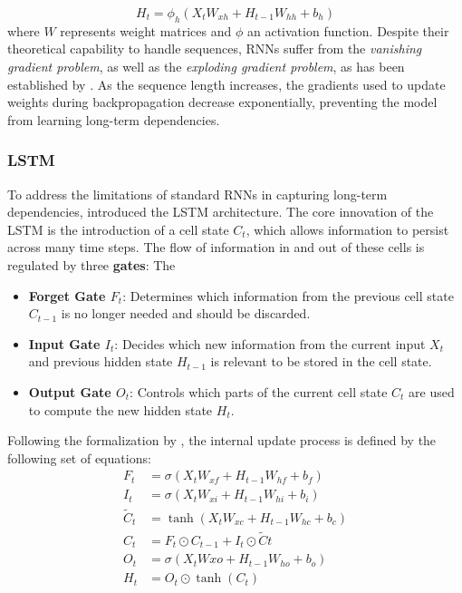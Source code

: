     \begin{equation}
        H_t = \phi_h (X_t W_{xh} + H_{t-1} W_{hh} + b_h) %
    \end{equation}
    where $W$ represents weight matrices and $\phi$ an activation function. Despite their theoretical capability to handle sequences, \acp{RNN} suffer from the \textit{vanishing gradient problem}, as well as the \textit{exploding gradient problem}, as has been established by \cite{279181bengio}. As the sequence length increases, the gradients used to update weights during backpropagation decrease exponentially, preventing the model from learning long-term dependencies.
    
    \subsubsection{LSTM}
     To address the limitations of standard \acp{RNN} in capturing long-term dependencies, \cite{hochreiterLSTM} introduced the \ac{LSTM} architecture. The core innovation of the \ac{LSTM} is the introduction of a cell state $C_t$, which allows information to persist across many time steps. The flow of information in and out of these cells is regulated by three \textbf{gates}: The
    \begin{itemize}
        \item \textbf{Forget Gate $F_t$}:  Determines which information from the previous cell state $C_{t-1}$ is no longer needed and should be discarded.
        \item \textbf{Input Gate $I_t$}: Decides which new information from the current input $X_t$ and previous hidden state $H_{t-1}$ is relevant to be stored in the cell state.
        \item \textbf{Output Gate $O_t$}: Controls which parts of the current cell state $C_t$ are used to compute the new hidden state $H_t$.
    \end{itemize}
    
     Following the formalization by \cite{gentleschmidt2019recurrentneuralnetworksrnns}, the internal update process is defined by the following set of equations:
     \begin{align}
         F_t &= \sigma(X_t W_{xf} + H_{t-1} W_{hf} + b_f) \\%
         I_t &= \sigma(X_t W_{xi} + H_{t-1} W_{hi} + b_i) \\%
         \tilde{C}_t &= \tanh(X_t W_{xc} + H_{t-1} W_{hc} + b_c) \\%
         C_t &= F_t \odot C_{t-1} + I_t \odot \tilde{C}t \\ %
         O_t &= \sigma(X_t W{xo} + H_{t-1} W_{ho} + b_o) \\ %
         H_t &= O_t \odot \tanh(C_t)
     \end{align}
     
